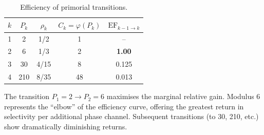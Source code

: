 \documentclass[12pt,a4paper]{article}
\theoremstyle{plain}
\theoremstyle{definition}
\theoremstyle{remark}
\begin{document}
\begin{table}[H]
\centering
\caption{Efficiency of primorial transitions.}
\label{tab:efficiency}
\begin{tabular}{@{}ccccc@{}}
\toprule
\(k\) & \(P_k\) & \(\rho_k\) & \(C_k = \varphi(P_k)\) & \(\mathrm{EF}_{k-1 \to k}\) \\
\midrule
1 & 2   & 1/2  & 1 & -- \\
2 & 6   & 1/3  & 2 & \textbf{1.00} \\
3 & 30  & 4/15 & 8 & 0.125 \\
4 & 210 & 8/35 & 48 & 0.013 \\
\bottomrule
\end{tabular}
\end{table}

The transition \(P_1=2 \to P_2=6\) maximises the marginal relative gain. Modulus 6 represents the ``elbow'' of the efficiency curve, offering the greatest return in selectivity per additional phase channel. Subsequent transitions (to 30, 210, etc.) show dramatically diminishing returns.
\end{document}
